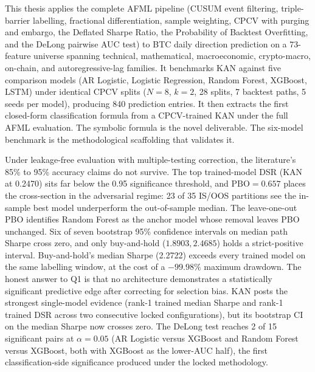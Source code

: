 \documentclass[12pt,a4paper,oneside]{article}
\begin{document}
This thesis applies the complete AFML pipeline (CUSUM event filtering, triple-barrier labelling, fractional differentiation, sample weighting, CPCV with purging and embargo, the Deflated Sharpe Ratio, the Probability of Backtest Overfitting, and the DeLong pairwise AUC test) to BTC daily direction prediction on a 73-feature universe spanning technical, mathematical, macroeconomic, crypto-macro, on-chain, and autoregressive-lag families. It benchmarks KAN against five comparison models (AR Logistic, Logistic Regression, Random Forest, XGBoost, LSTM) under identical CPCV splits ($N = 8$, $k = 2$, 28 splits, 7 backtest paths, 5 seeds per model), producing 840 prediction entries. It then extracts the first closed-form classification formula from a CPCV-trained KAN under the full AFML evaluation. The symbolic formula is the novel deliverable. The six-model benchmark is the methodological scaffolding that validates it.

Under leakage-free evaluation with multiple-testing correction, the literature's 85\% to 95\% accuracy claims do not survive. The top trained-model DSR (KAN at 0.2470) sits far below the 0.95 significance threshold, and $\text{PBO} = 0.657$ places the cross-section in the adversarial regime: 23 of 35 IS/OOS partitions see the in-sample best model underperform the out-of-sample median. The leave-one-out PBO identifies Random Forest as the anchor model whose removal leaves PBO unchanged. Six of seven bootstrap 95\% confidence intervals on median path Sharpe cross zero, and only buy-and-hold ($1.8903, 2.4685$) holds a strict-positive interval. Buy-and-hold's median Sharpe (2.2722) exceeds every trained model on the same labelling window, at the cost of a $-99.98\%$ maximum drawdown. The honest answer to Q1 is that no architecture demonstrates a statistically significant predictive edge after correcting for selection bias. KAN posts the strongest single-model evidence (rank-1 trained median Sharpe and rank-1 trained DSR across two consecutive locked configurations), but its bootstrap CI on the median Sharpe now crosses zero. The DeLong test reaches 2 of 15 significant pairs at $\alpha = 0.05$ (AR Logistic versus XGBoost and Random Forest versus XGBoost, both with XGBoost as the lower-AUC half), the first classification-side significance produced under the locked methodology.
\end{document}
